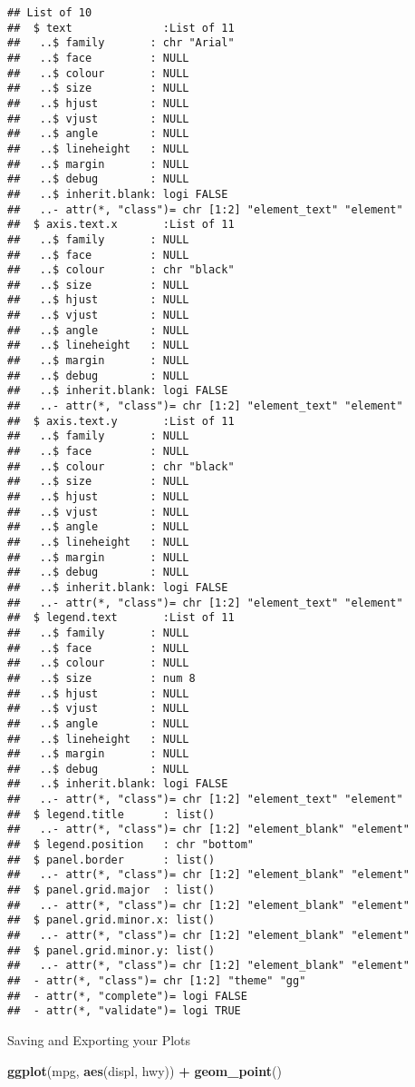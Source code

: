 \documentclass[
]{article}
\newenvironment{Shaded}{\begin{snugshade}}{\end{snugshade}}
\newcommand{\FunctionTok}[1]{\textcolor[rgb]{0.13,0.29,0.53}{\textbf{#1}}}
\newcommand{\NormalTok}[1]{#1}
\newcommand{\SpecialCharTok}[1]{\textcolor[rgb]{0.81,0.36,0.00}{\textbf{#1}}}
\begin{document}
\begin{verbatim}
## List of 10
##  $ text              :List of 11
##   ..$ family       : chr "Arial"
##   ..$ face         : NULL
##   ..$ colour       : NULL
##   ..$ size         : NULL
##   ..$ hjust        : NULL
##   ..$ vjust        : NULL
##   ..$ angle        : NULL
##   ..$ lineheight   : NULL
##   ..$ margin       : NULL
##   ..$ debug        : NULL
##   ..$ inherit.blank: logi FALSE
##   ..- attr(*, "class")= chr [1:2] "element_text" "element"
##  $ axis.text.x       :List of 11
##   ..$ family       : NULL
##   ..$ face         : NULL
##   ..$ colour       : chr "black"
##   ..$ size         : NULL
##   ..$ hjust        : NULL
##   ..$ vjust        : NULL
##   ..$ angle        : NULL
##   ..$ lineheight   : NULL
##   ..$ margin       : NULL
##   ..$ debug        : NULL
##   ..$ inherit.blank: logi FALSE
##   ..- attr(*, "class")= chr [1:2] "element_text" "element"
##  $ axis.text.y       :List of 11
##   ..$ family       : NULL
##   ..$ face         : NULL
##   ..$ colour       : chr "black"
##   ..$ size         : NULL
##   ..$ hjust        : NULL
##   ..$ vjust        : NULL
##   ..$ angle        : NULL
##   ..$ lineheight   : NULL
##   ..$ margin       : NULL
##   ..$ debug        : NULL
##   ..$ inherit.blank: logi FALSE
##   ..- attr(*, "class")= chr [1:2] "element_text" "element"
##  $ legend.text       :List of 11
##   ..$ family       : NULL
##   ..$ face         : NULL
##   ..$ colour       : NULL
##   ..$ size         : num 8
##   ..$ hjust        : NULL
##   ..$ vjust        : NULL
##   ..$ angle        : NULL
##   ..$ lineheight   : NULL
##   ..$ margin       : NULL
##   ..$ debug        : NULL
##   ..$ inherit.blank: logi FALSE
##   ..- attr(*, "class")= chr [1:2] "element_text" "element"
##  $ legend.title      : list()
##   ..- attr(*, "class")= chr [1:2] "element_blank" "element"
##  $ legend.position   : chr "bottom"
##  $ panel.border      : list()
##   ..- attr(*, "class")= chr [1:2] "element_blank" "element"
##  $ panel.grid.major  : list()
##   ..- attr(*, "class")= chr [1:2] "element_blank" "element"
##  $ panel.grid.minor.x: list()
##   ..- attr(*, "class")= chr [1:2] "element_blank" "element"
##  $ panel.grid.minor.y: list()
##   ..- attr(*, "class")= chr [1:2] "element_blank" "element"
##  - attr(*, "class")= chr [1:2] "theme" "gg"
##  - attr(*, "complete")= logi FALSE
##  - attr(*, "validate")= logi TRUE
\end{verbatim}

Saving and Exporting your Plots

\begin{Shaded}
\begin{Highlighting}[]
\FunctionTok{ggplot}\NormalTok{(mpg, }\FunctionTok{aes}\NormalTok{(displ, hwy)) }\SpecialCharTok{+} \FunctionTok{geom\_point}\NormalTok{()}
\end{Highlighting}
\end{Shaded}
\end{document}
